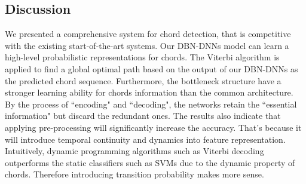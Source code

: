 \documentclass{article}
\begin{document}
\subsection{Discussion}
We presented a comprehensive system for chord detection, that is competitive with the existing start-of-the-art systems. Our DBN-DNNs model can learn a high-level probabilistic representations for chords. The Viterbi algorithm is applied to find a global optimal path based on the output of our DBN-DNNs as the predicted chord sequence. Furthermore, the bottleneck structure have a stronger learning ability for chords information than the common architecture. By the process of ``encoding" and ``decoding", the networks retain the ``essential information" but discard the redundant ones. The results also indicate that applying pre-processing will significantly increase the accuracy. That's because it will introduce temporal continuity and dynamics into feature representation. Intuitively, dynamic programming algorithms such as Viterbi decoding outperforms the static classifiers such as SVMs due to the dynamic property of chords. Therefore introducing transition probability makes more sense. 




\end{document}
